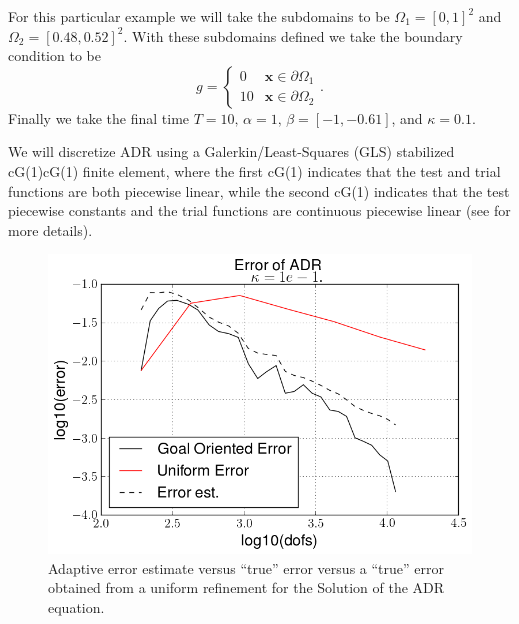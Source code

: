     For this particular example we will take the subdomains to be $\Omega_1 =
    [0,1]^2$ and $\Omega_2 = [0.48,0.52]^2$. With these subdomains defined we
    take the boundary condition to be
    \begin{equation}
        g = \begin{cases}
            0   &\mathbf{x} \in \partial \Omega_1 \\
            10  &\mathbf{x} \in \partial \Omega_2
        \end{cases}.
        \label{eq:ADRBCs}
    \end{equation}
    Finally we take the final time $T=10,\, \alpha=1,\, \beta = \left[ -1,
    -0.61 \right]$, and $\kappa = 0.1$.

    We will discretize ADR using a Galerkin\slash Least-Squares (GLS) stabilized
    cG(1)cG(1) finite element, where the first cG(1) indicates that the test and
    trial functions are both piecewise linear, while the second cG(1) indicates
    that the test piecewise constants and the trial functions are continuous
    piecewise linear (see \cite{Hoffman2006a} for more details).

    
    
    \begin{figure}[H]
        \centering
        \includegraphics[scale=0.5]{Figures/AdaptiveADRkappa1E-1.png}
        \caption{Adaptive error estimate versus ``true'' error versus a ``true''
            error obtained from a uniform refinement for the Solution of the
            ADR equation.}
        \label{fig:ADR_EI}
    \end{figure}
